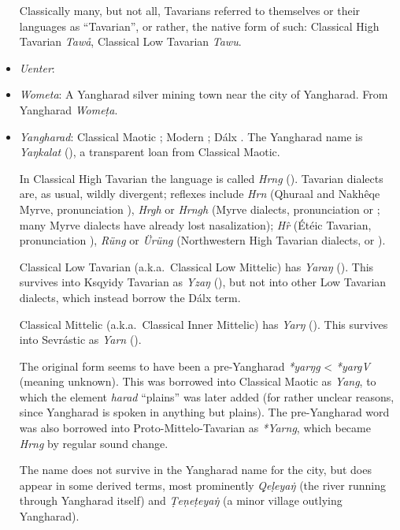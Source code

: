 \documentclass{article}
\begin{document}
\begin{itemize}
 Classically many, but not all, Tavarians referred to themselves or their languages as ``Tavarian'', or rather, the native form of such: Classical High Tavarian \textit{Tawå}, Classical Low Tavarian \textit{Tawu}.

 \item \textit{Uenter}:

 \item \textit{Wometa}: A Yangharad silver mining town near the city of Yangharad. From Yangharad \textit{Wome\d{t}a}.

 \item \textit{Yangharad}: Classical Maotic ; Modern ; Dálx . The Yangharad name is \textit{Yaŋkalat} (), a transparent loan from Classical Maotic.

 In Classical High Tavarian the language is called \textit{Hrng} (). Tavarian dialects are, as usual, wildly divergent; reflexes include \textit{Hrn} (Qhuraal and Nakhêqe Myrve, pronunciation ), \textit{Hrgh} or \textit{Hrngh} (Myrve dialects, pronunciation  or ; many Myrve dialects have already lost nasalization); \textit{H\^{r}} (Étéic Tavarian, pronunciation ), \textit{Rüng} or \textit{Ürüng} (Northwestern High Tavarian dialects,  or ).

Classical Low Tavarian (a.k.a.\ Classical Low Mittelic) has \textit{Yaraŋ} (). This survives into Ksqyidy Tavarian as \textit{Yzaŋ} (), but not into other Low Tavarian dialects, which instead borrow the Dálx term.

Classical Mittelic (a.k.a.\ Classical Inner Mittelic) has \textit{Yarŋ} (). This survives into Sevrástic as \textit{Yarn} ().

 The original form seems to have been a pre-Yangharad \textit{*yarŋg} < \textit{*yargV} (meaning unknown). This was borrowed into Classical Maotic as \textit{Yang}, to which the element \textit{harad} ``plains'' was later added (for rather unclear reasons, since Yangharad is spoken in anything but plains). The pre-Yang\-harad word was also borrowed into Proto-Mittelo-Tavarian as \textit{*Yarng}, which became \textit{Hrng} by regular sound change.

 The name does not survive in the Yangharad name for the city, but does appear in some derived terms, most prominently \textit{\d{Q}e\d{l}eya\.{ŋ}} (the river running through Yangharad itself) and \textit{\d{T}e\d{n}e\d{t}eya\.{ŋ}} (a minor village outlying Yangharad).

\end{itemize}
\end{document}
